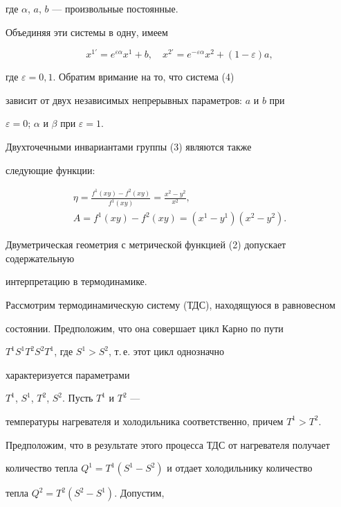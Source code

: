 где $\alpha$, $a$, $b$ --- произвольные постоянные.


Объединяя эти системы в одну, имеем


\begin{equation}


x^{1 \prime}=e^{\varepsilon\alpha} x^1+b,\quad


x^{2 \prime}=e^{-\varepsilon\alpha} x^2+(1 - \varepsilon)a,


\end{equation}


где $\varepsilon=0, 1$. Обратим вримание на то, что система (4)


зависит от двух независимых непрерывных параметров: $a$ и $b$ при 


$\varepsilon=0$; $\alpha$ и $\beta$ при $\varepsilon=1$. 


Двухточечными инвариантами группы (3) являются также


следующие функции:


\begin{gather}


\eta=\frac{f^1(xy) - f^2(xy)}{f^1(xy)}=\frac{x^2 - y^2}{x^2},\\


A=f^1(xy) - f^2(xy)=(x^1 - y^1)(x^2 - y^2).


\end{gather}





Двуметрическая геометрия с метрической функцией (2) допускает содержательную


интерпретацию в термодинамике.


Рассмотрим термодинамическую систему (ТДС), находящуюся в равновесном


состоянии. Предположим, что она совершает цикл Карно по пути


$T^1S^1T^2S^2T^1$, где $S^1 > S^2$, т.\,е. этот цикл однозначно 


характеризуется параметрами


$T^1$, $S^1$, $T^2$, $S^2$. Пусть $T^1$ и $T^2$ ---


температуры нагревателя и холодильника соответственно, причем $T^1 > T^2$.


Предположим, что в результате этого процесса ТДС от нагревателя получает


количество тепла $Q^1=T^1(S^1 - S^2)$ и отдает холодильнику количество


тепла $Q^2=T^2(S^2 - S^1)$. Допустим,


